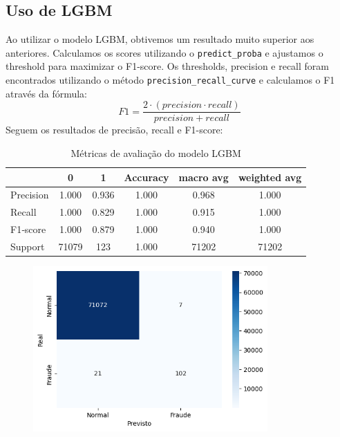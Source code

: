 \documentclass[conference]{IEEEtran}
\begin{document}
\subsection{Uso de LGBM}
\label{subsec:validacao}
Ao utilizar o modelo LGBM, obtivemos um resultado muito superior aos anteriores. Calculamos os scores utilizando o \texttt{predict\_proba} e ajustamos o threshold para maximizar o F1-score. Os thresholds, precision e recall foram encontrados utilizando o método \texttt{precision\_recall\_curve} e calculamos o F1 através da fórmula:
\begin{equation}
    F1 = \frac{2 \cdot (precision \cdot recall)}{precision + recall}
\end{equation}
Seguem os resultados de precisão, recall e F1-score:
\begin{table}[H]
    \centering
    \begin{tabular}{lccccc}
        \toprule
    & \textbf{0} & \textbf{1} & \textbf{Accuracy} & \textbf{macro avg} & \textbf{weighted avg} \\
        \midrule
        Precision  & 1.000 & 0.936 & 1.000 & 0.968 & 1.000 \\
        Recall     & 1.000 & 0.829 & 1.000 & 0.915 & 1.000 \\
        F1‐score   & 1.000 & 0.879 & 1.000 & 0.940 & 1.000 \\
        Support    & 71079 & 123   & 1.000 & 71202 & 71202  \\
        \bottomrule
    \end{tabular}
    \caption{Métricas de avaliação do modelo LGBM}
    \label{tab:metricas_lgbm}
\end{table}
  \begin{figure}[H]
    \centering
    \includegraphics[width=0.8\textwidth]{../output/matriz confusao lgbm.png}
    \label{fig:matriz_confusao_lgbm}
  \end{figure}
\end{document}
